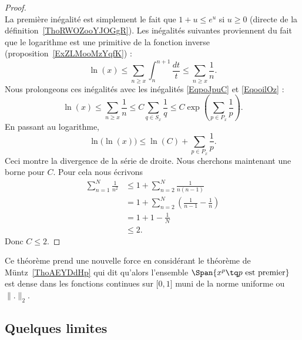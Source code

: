 \begin{proof}
\begin{equation}
	\end{equation}
	La première inégalité est simplement le fait que \( 1+u\leq e^u\) si \( u\geq 0\) (directe de la définition~\ref{ThoRWOZooYJOGgR}). Les inégalités suivantes proviennent du fait que le logarithme est une primitive de la fonction inverse (proposition~\ref{ExZLMooMzYqfK}) :
	\begin{equation}
		\ln(x)\leq \sum_{n\geq x}\int_{n}^{n+1}\frac{dt}{ t }\leq \sum_{n\geq x}\frac{1}{ n }.
	\end{equation}
	Nous prolongeons ces inégalités avec les inégalités \eqref{EqpoJpuC} et \eqref{EqooilOz} :
	\begin{equation}
		\ln(x)\leq \sum_{n\geq x}\frac{1}{ n }\leq C\sum_{q\in S_x}\frac{1}{ q }\leq C \exp\left( \sum_{p\in P_x}\frac{1}{ p } \right).
	\end{equation}
	En passant au logarithme,
	\begin{equation}
		\ln\big( \ln(x) \big)\leq\ln(C)+\sum_{p\in P_x}\frac{1}{ p }.
	\end{equation}
	Ceci montre la divergence de la série de droite. Nous cherchons maintenant une borne pour \( C\). Pour cela nous écrivons
	\begin{subequations}
		\begin{align}
			\sum_{n=1}^N\frac{1}{ n^2 } & \leq 1+\sum_{n=2}^N\frac{1}{ n(n-1) }                       \\
			                            & =1+\sum_{n=2}^N\left( \frac{1}{ n-1 }-\frac{1}{ n } \right) \\
			                            & =1+1-\frac{1}{ N }                                          \\
			                            & \leq 2.
		\end{align}
	\end{subequations}
	Donc \( C\leq 2\).
\end{proof}
Ce théorème prend une nouvelle force en considérant le théorème de Müntz~\ref{ThoAEYDdHp} qui dit qu'alors l'ensemble \( \Span\{ x^p\tq  p\text{ est premier} \}\) est dense dans les fonctions continues sur \( \mathopen[ 0 , 1 \mathclose]\) muni de la norme uniforme ou \( \| . \|_2\).

\subsection{Quelques limites}

